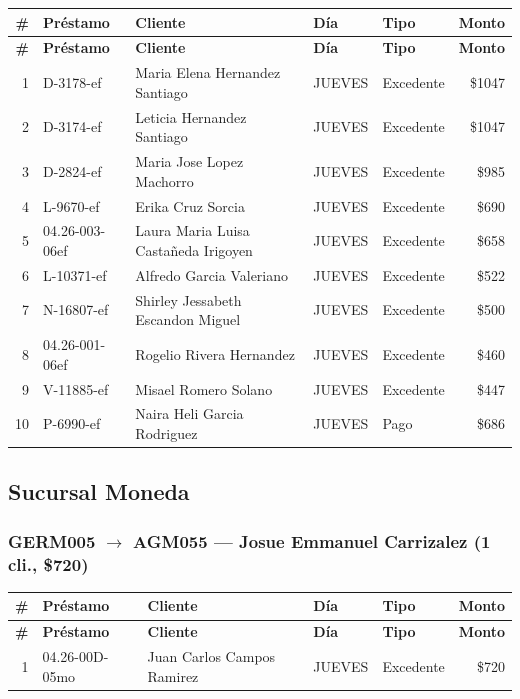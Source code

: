 \documentclass[11pt,a4paper]{article}
\newcommand{\money}[1]{\$\num{#1}}
\begin{document}
\begin{center}
\renewcommand{\arraystretch}{1.1}
\footnotesize
\begin{longtable}{rlp{5.5cm}llr}
\toprule
\textbf{\#} & \textbf{Pr\'estamo} & \textbf{Cliente} & \textbf{D\'ia} & \textbf{Tipo} & \textbf{Monto} \\
\midrule
\endfirsthead
\toprule
\textbf{\#} & \textbf{Pr\'estamo} & \textbf{Cliente} & \textbf{D\'ia} & \textbf{Tipo} & \textbf{Monto} \\
\midrule
\endhead
1 & D-3178-ef & Maria Elena Hernandez Santiago & JUEVES & Excedente & \money{1047} \\
2 & D-3174-ef & Leticia Hernandez Santiago & JUEVES & Excedente & \money{1047} \\
3 & D-2824-ef & Maria Jose Lopez Machorro & JUEVES & Excedente & \money{985} \\
4 & L-9670-ef & Erika Cruz Sorcia & JUEVES & Excedente & \money{690} \\
5 & 04.26-003-06ef & Laura Maria Luisa Castañeda Irigoyen & JUEVES & Excedente & \money{658} \\
6 & L-10371-ef & Alfredo Garcia Valeriano & JUEVES & Excedente & \money{522} \\
7 & N-16807-ef & Shirley Jessabeth Escandon Miguel & JUEVES & Excedente & \money{500} \\
8 & 04.26-001-06ef & Rogelio Rivera Hernandez & JUEVES & Excedente & \money{460} \\
9 & V-11885-ef & Misael Romero Solano & JUEVES & Excedente & \money{447} \\
10 & P-6990-ef & Naira Heli Garcia Rodriguez & JUEVES & Pago & \money{686} \\

\bottomrule
\end{longtable}
\end{center}
\subsection{Sucursal Moneda}

\subsubsection{GERM005 $\rightarrow$ AGM055 --- Josue Emmanuel Carrizalez (1 cli., \money{720})}


\begin{center}
\renewcommand{\arraystretch}{1.1}
\footnotesize
\begin{longtable}{rlp{5.5cm}llr}
\toprule
\textbf{\#} & \textbf{Pr\'estamo} & \textbf{Cliente} & \textbf{D\'ia} & \textbf{Tipo} & \textbf{Monto} \\
\midrule
\endfirsthead
\toprule
\textbf{\#} & \textbf{Pr\'estamo} & \textbf{Cliente} & \textbf{D\'ia} & \textbf{Tipo} & \textbf{Monto} \\
\midrule
\endhead
1 & 04.26-00D-05mo & Juan Carlos Campos Ramirez & JUEVES & Excedente & \money{720} \\

\bottomrule
\end{longtable}
\end{center}
\end{document}
